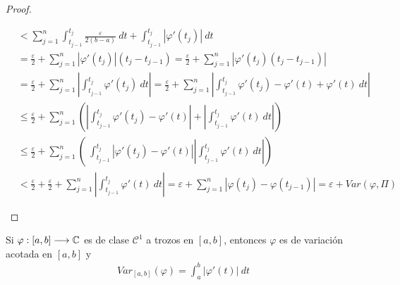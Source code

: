 \begin{proof}
\begin{itemize}
\begin{align*}
                                                              & < \sum_{j=1}^{n}{\int_{t_{j-1}}^{t_j}{\frac{\varepsilon}{2(b-a)}}\ dt + \int_{t_{j-1}}^{t_j}{|\varphi'(t_j)| \ dt}}                                                                                                             \\
                                                              & = \frac{\varepsilon}{2} + \sum_{j=1}^{n}{|\varphi'(t_j)|(t_j - t_{j-1})} = \frac{\varepsilon}{2} + \sum_{j=1}^{n}{|\varphi'(t_j)(t_j - t_{j-1})|}                                                                               \\
                                                              & = \frac{\varepsilon}{2} + \sum_{j=1}^{n}{\left| \int_{t_{j-1}}^{t_j}{\varphi'(t_j)} \ dt \right|} = \frac{\varepsilon}{2} + \sum_{j=1}^{n}{\left| \int_{t_{j-1}}^{t_j}{\varphi'(t_j) - \varphi'(t) + \varphi'(t)} \ dt \right|} \\
                                                              & \leq \frac{\varepsilon}{2} + \sum_{j=1}^{n} \left( \left| \int_{t_{j-1}}^{t_j}{\varphi'(t_j) - \varphi'(t) }\right| + \left|\int_{t_{j-1}}^{t_j}{\varphi'(t) \ dt} \right|\right)                                               \\
                                                              & \leq \frac{\varepsilon}{2} + \sum_{j=1}^{n} \left( \ \int_{t_{j-1}}^{t_j}{|\varphi'(t_j) - \varphi'(t) |} \left|\int_{t_{j-1}}^{t_j}{\varphi'(t) \ dt} \right|\right)                                                           \\
                                                              & < \frac{\varepsilon}{2} + \frac{\varepsilon}{2} + \sum_{j=1}^{n}{\left|\int_{t_{j-1}}^{t_j}{\varphi'(t) \ dt} \right|} = \varepsilon + \sum_{j=1}^{n}{|\varphi(t_j) - \varphi(t_{j-1})|} = \varepsilon + Var(\varphi, \Pi)
              \end{align*}
    \end{itemize}
\end{proof}

\begin{prop}
    Si $\varphi : [a,b] \longrightarrow \mathbb{C}$ es de clase $\mathcal{C}^1$ a trozos en $[a,b]$, entonces $\varphi$ es de variación acotada en $[a,b]$ y
    \begin{align*}
        Var_{[a,b]}(\varphi) = \int_{a}^{b}{\left|\varphi'(t)\right| \ dt}
    \end{align*}
\end{prop}


